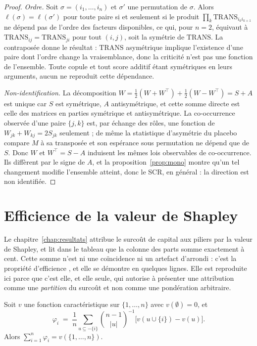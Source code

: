 \begin{proof}
\emph{Ordre.} Soit $\sigma=(i_1,\dots,i_n)$ et $\sigma'$ une permutation de $\sigma$. Alors
$\ell(\sigma)=\ell(\sigma')$ pour toute paire si et seulement si le produit
$\prod_k \mathrm{TRANS}_{i_k i_{k+1}}$ ne dépend pas de l'ordre des facteurs disponibles, ce qui,
pour $n=2$, équivaut à $\mathrm{TRANS}_{ij}=\mathrm{TRANS}_{ji}$ pour tout $(i,j)$, soit la
symétrie de $\mathrm{TRANS}$. La contraposée donne le résultat : $\mathrm{TRANS}$ asymétrique
implique l'existence d'une paire dont l'ordre change la vraisemblance, donc la criticité n'est
pas une fonction de l'ensemble. Toute copule et tout score additif étant symétriques en leurs
arguments, aucun ne reproduit cette dépendance.

\emph{Non-identification.} La décomposition $W=\tfrac12(W+W^\top)+\tfrac12(W-W^\top)=S+A$ est
unique car $S$ est symétrique, $A$ antisymétrique, et cette somme directe est celle des
matrices en parties symétrique et antisymétrique. La co-occurrence observée d'une paire
$\{j,k\}$ est, par échange des rôles, une fonction de $W_{jk}+W_{kj}=2S_{jk}$ seulement ; de
même la statistique d'asymétrie du placebo compare $M$ à sa transposée et son espérance sous
permutation ne dépend que de $S$. Donc $W$ et $W^\top=S-A$ induisent les mêmes lois observables
de co-occurrence. Ils diffèrent par le signe de $A$, et la proposition~\ref{prop:mono} montre
qu'un tel changement modifie l'ensemble atteint, donc le SCR, en général : la direction est non
identifiée.
\end{proof}

\section*{Efficience de la valeur de Shapley}
\label{sec:ann-efficience-shapley}

Le chapitre~\ref{chap:resultats} attribue le surcoût de capital aux piliers par la valeur de
Shapley, et lit dans le tableau que la colonne des parts somme exactement à cent. Cette somme
n'est ni une coïncidence ni un artefact d'arrondi : c'est la propriété d'efficience
\citep{Shapley1953}, et elle se démontre en quelques lignes. Elle est reproduite ici parce que
c'est elle, et elle seule, qui autorise à présenter une attribution comme une \emph{partition} du
surcoût et non comme une pondération arbitraire.

\begin{proposition}[Efficience]
\label{prop:efficience}
Soit $v$ une fonction caractéristique sur $\{1,\dots,n\}$ avec $v(\emptyset)=0$, et
\[
  \varphi_i \;=\; \frac1n \sum_{u \subseteq -\{i\}} \binom{n-1}{|u|}^{-1}
                  \bigl[v(u \cup \{i\}) - v(u)\bigr].
\]
Alors $\sum_{i=1}^{n} \varphi_i = v(\{1,\dots,n\})$.
\end{proposition}

